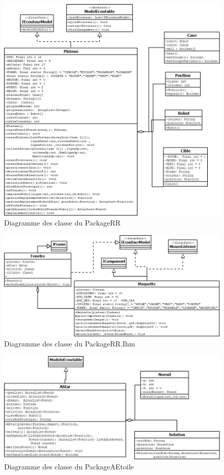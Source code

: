 \documentclass[12pt]{article}
\begin{document}
			\begin{figure}[htpb]
					\includegraphics[scale=0.7]{./images/rr.jpg}
						\caption{Diagramme des classe du PackageRR \label{figure1} }
			\end{figure}
			
			\newpage
			\begin{figure}[htpb]
				\includegraphics[scale=0.6]{./images/ihm.jpg}
				\caption{Diagramme des classe du PackageRR.Ihm}
			\end{figure}
		
		\newpage
		\begin{figure}[htpb]
			\includegraphics[scale=0.7]{./images/a.jpg}
			\caption{Diagramme des classe du PackageAEtoile}
		\end{figure}
			
\end{document}
